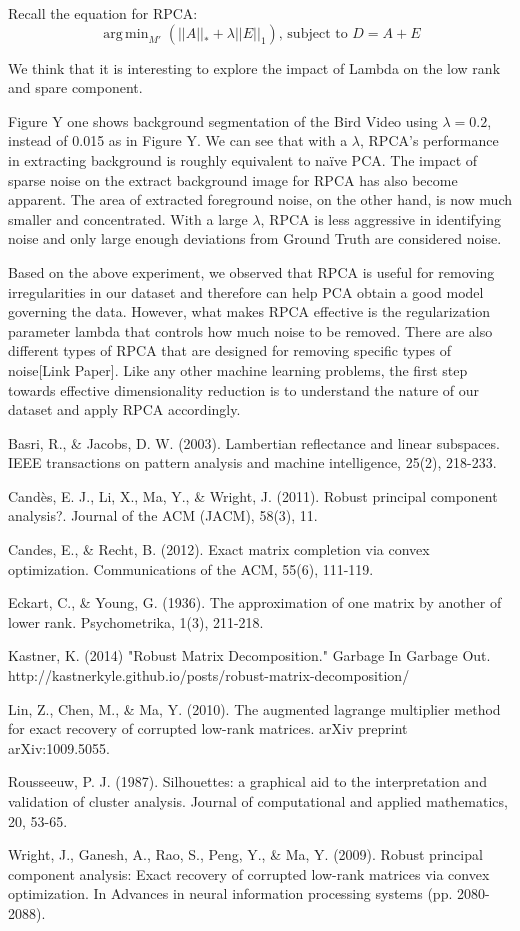 \documentclass[11pt]{scrartcl} %
\DeclareMathOperator*{\argmin}{arg\,min}
\theoremstyle{plain}
\begin{document}
Recall the equation for RPCA:
\[ \argmin_{M'}(||A||_* + \lambda||E||_1) \text{,  subject to  }  D = A + E \]

We think that it is interesting to explore the impact of Lambda on the low rank and spare component. 

Figure Y one shows background segmentation of the Bird Video using $\lambda = 0.2$, instead of 0.015 as in Figure Y. We can see that with a $\lambda$, RPCA’s performance in extracting background is roughly equivalent to naïve PCA. The impact of sparse noise on the extract background image for RPCA has also become apparent. The area of extracted foreground noise, on the other hand, is now much smaller and concentrated. With a large $\lambda$, RPCA is less aggressive in identifying noise and only large enough deviations from Ground Truth are considered noise.

Based on the above experiment, we observed that RPCA is useful for removing irregularities in our dataset and therefore can help PCA obtain a good model governing the data. However, what makes RPCA effective is the regularization parameter lambda that controls how much noise to be removed. There are also different types of RPCA that are designed for removing specific types of noise[Link Paper]. Like any other machine learning problems, the first step towards effective dimensionality reduction is to understand the nature of our dataset and apply RPCA accordingly.


\begin{thebibliography}{9}

 Basri, R., \& Jacobs, D. W. (2003). Lambertian reflectance and linear subspaces. IEEE transactions on pattern analysis and machine intelligence, 25(2), 218-233.

 Candès, E. J., Li, X., Ma, Y., \& Wright, J. (2011). Robust principal component analysis?. Journal of the ACM (JACM), 58(3), 11.

 Candes, E., \& Recht, B. (2012). Exact matrix completion via convex optimization. Communications of the ACM, 55(6), 111-119.

 Eckart, C., \& Young, G. (1936). The approximation of one matrix by another of lower rank. Psychometrika, 1(3), 211-218.

 Kastner, K. (2014) "Robust Matrix Decomposition." Garbage In Garbage Out. http://kastnerkyle.github.io/posts/robust-matrix-decomposition/

 Lin, Z., Chen, M., \& Ma, Y. (2010). The augmented lagrange multiplier method for exact recovery of corrupted low-rank matrices. arXiv preprint arXiv:1009.5055.

 Rousseeuw, P. J. (1987). Silhouettes: a graphical aid to the interpretation and validation of cluster analysis. Journal of computational and applied mathematics, 20, 53-65.

 Wright, J., Ganesh, A., Rao, S., Peng, Y., \& Ma, Y. (2009). Robust principal component analysis: Exact recovery of corrupted low-rank matrices via convex optimization. In Advances in neural information processing systems (pp. 2080-2088).

\end{thebibliography}
\end{document}
